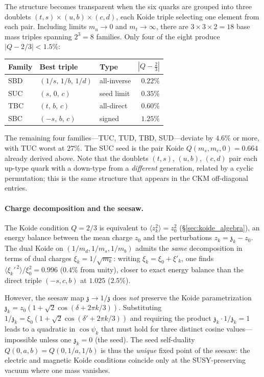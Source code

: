 \documentclass[12pt,a4paper]{article}
\newcommand{\zch}{\mathfrak{z}}
\begin{document}
The structure becomes transparent when the six quarks are
grouped into three doublets
$(t,s)\times(u,b)\times(c,d)$,
each Koide triple selecting one element from each pair.
Including limits $m_u\!\to\! 0$ and $m_t\!\to\!\infty$,
there are $3\times 3\times 2 = 18$ base mass triples spanning
$2^3 = 8$ families.  Only four of the eight produce
$|Q - 2/3| < 1.5\%$:
%
\begin{center}
\small
\begin{tabular}{lllr}
\textbf{Family} & \textbf{Best triple} & \textbf{Type} & $|Q-\tfrac{2}{3}|$ \\
\hline
SBD & $(1/s,\,1/b,\,1/d)$     & all-inverse  & $0.22\%$ \\
SUC & $(s,\,0,\,c)$            & seed limit   & $0.35\%$ \\
TBC & $(t,\,b,\,c)$            & all-direct   & $0.60\%$ \\
SBC & $(-s,\,b,\,c)$           & signed       & $1.25\%$ \\
\end{tabular}
\end{center}
%
The remaining four families---TUC, TUD, TBD, SUD---deviate
by $4.6\%$ or more, with TUC worst at $27\%$.
The SUC seed is the pair Koide $Q(m_s,m_c,0) = 0.664$ already
derived above.
Note that the doublets $(t,s)$, $(u,b)$, $(c,d)$ pair each
up-type quark with a down-type from a \emph{different} generation,
related by a cyclic permutation; this is the same
structure that appears in the CKM off-diagonal entries.

\paragraph{Charge decomposition and the seesaw.}
The Koide condition $Q=2/3$ is equivalent to
$\langle z_k^2\rangle = z_0^2$ (\S\ref{sec:koide_algebra}),
an energy balance between the mean charge $z_0$ and
the perturbations $z_k = \zch_k - z_0$.
The dual Koide on $(1/m_d,1/m_s,1/m_b)$ admits the
\emph{same} decomposition in terms of dual charges
$\xi_k = 1/\sqrt{m_k}$: writing $\xi_k = \xi_0 + \xi'_k$,
one finds $\langle\xi_k'^{\,2}\rangle/\xi_0^2 = 0.996$
($0.4\%$ from unity), closer to exact energy balance than
the direct triple $(-s,c,b)$ at $1.025$ ($2.5\%$).

However, the seesaw map $\zch \to 1/\zch$ does \emph{not}
preserve the Koide parametrization
$\zch_k = z_0(1+\sqrt{2}\cos(\delta+2\pi k/3))$.
Substituting $1/\zch_k = \xi_0(1+\sqrt{2}\cos(\delta'+2\pi k/3))$
and requiring the product $\zch_k \cdot 1/\zch_k = 1$
leads to a quadratic in $\cos\psi_k$ that must hold for
three distinct cosine values---impossible unless
one $\zch_k = 0$ (the seed).
The seed self-duality $Q(0,a,b) = Q(0,1/a,1/b)$ is
thus the \emph{unique} fixed point of the seesaw:
the electric and magnetic Koide conditions coincide
only at the SUSY-preserving vacuum where one mass
vanishes.
\end{document}
